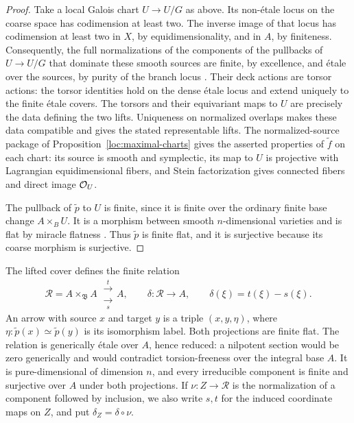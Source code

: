 \begin{proof}
Take a local Galois chart \(U\to U/G\) as above.  Its non-étale
locus on the coarse space has codimension at least two.
The inverse image of that locus has codimension at least two in \(X\),
by equidimensionality, and in \(A\), by finiteness.
Consequently, the full normalizations of the components of the
pullbacks of \(U\to U/G\) that dominate these smooth sources are
finite, by excellence, and étale over the sources, by purity of the branch locus
\cite[Tag 0BMB]{StacksProject}.  Their deck actions are torsor actions:
the torsor identities hold on the dense étale locus and extend uniquely
to the finite étale covers.  The torsors and their equivariant maps to
\(U\) are precisely the data defining the two lifts.
Uniqueness on normalized overlaps makes these data compatible and
gives the stated representable lifts.  The normalized-source package
of Proposition~\ref{loc:maximal-charts} gives the asserted properties
of \(\widetilde f\) on each chart: its source is smooth and symplectic,
its map to \(U\) is projective with Lagrangian equidimensional fibers,
and Stein factorization
gives connected fibers and direct image \(\mathcal O_U\).

The pullback of \(\widetilde p\) to \(U\) is finite, since it is finite
over the ordinary finite base change \(A\times_B U\).  It is a morphism
between smooth \(n\)-dimensional varieties and is flat by miracle flatness
\cite[Tag 00R4]{StacksProject}.  Thus \(\widetilde p\) is finite flat, and it is
surjective because its coarse morphism is surjective.
\end{proof}

The lifted cover defines the finite relation
\begin{equation}\label{quot:relation}
 \mathcal R=A\times_{\mathfrak B}A
   \ \substack{\xrightarrow{\ t\ }\\[-.6ex]\xrightarrow[\ s\ ]{\ }}
 A,\qquad
 \delta:\mathcal R\longrightarrow A,\qquad
 \delta(\xi)=t(\xi)-s(\xi).
\end{equation}
An arrow with source \(x\) and target \(y\) is a triple
\((x,y,\eta)\), where
\(\eta:\widetilde p(x)\simeq\widetilde p(y)\) is its isomorphism label.
Both projections are finite flat.  The relation is generically
étale over \(A\), hence reduced: a nilpotent section would be zero
generically and would contradict torsion-freeness over the integral
base \(A\).  It is pure-dimensional of dimension \(n\), and every
irreducible component is finite and surjective over \(A\) under both
projections.
If \(\nu:Z\to\mathcal R\) is the normalization of a component followed
by inclusion, we also write \(s,t\) for the induced coordinate maps
on \(Z\), and put \(\delta_Z=\delta\circ\nu\).

